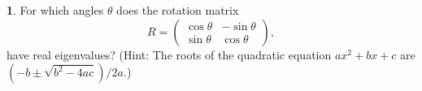 \documentclass{article}
\theoremstyle{definition}
\newtheorem{prob}{}
\begin{document}
	
\begin{prob} For which angles $\theta$ does the rotation matrix
	\[R = \begin{pmatrix} \cos \theta & -\sin \theta \\ \sin \theta & \cos\theta \end{pmatrix}, \]
	have real eigenvalues? (Hint: The roots of the quadratic equation $ax^2 + bx + c$ are $(-b \pm \sqrt{b^2-4ac})/2a$.)
\end{prob}
	
\end{document}
